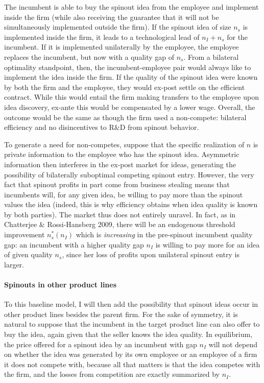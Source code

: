\documentclass[12pt,english]{article}
\theoremstyle{remark}
\begin{document}
The incumbent is able to buy the spinout idea from the employee and implement inside the firm (while also receiving the guarantee that it will not be simultaneously implemented outside the firm). If the spinout idea of size $n_s$ is implemented inside the firm, it leads to a technological lead of $n_I + n_s$ for the incumbent. If it is implemented unilaterally by the employee, the employee replaces the incumbent, but now with a quality gap of $n_s$. From a bilateral optimality standpoint, then, the incumbent-employee pair would always like to implement the idea inside the firm. If the quality of the spinout idea were known by both the firm and the employee, they would ex-post settle on the efficient contract. While this would entail the firm making transfers to the employee upon idea discovery, ex-ante this would be compensated by a lower wage. Overall, the outcome would be the same as though the firm used a non-compete: bilateral efficiency and no disincentives to R\&D from spinout behavior. 

To generate a need for non-competes, suppose that the specific realization of $n$ is private information to the employee who has the spinout idea. Asymmetric information then interferes in the ex-post market for ideas, generating the possibility of bilaterally suboptimal competing spinout entry. However, the very fact that spinout profits in part come from business stealing means that incumbents will, for any given idea, be willing to pay more than the spinout values the idea (indeed, this is why efficiency obtains when idea quality is known by both parties). The market thus does not entirely unravel. In fact, as in Chatterjee \& Rossi-Hansberg 2009, there will be an endogenous threshold improvement $n_s^*(n_I)$ which is \textit{increasing} in the pre-spinout incumbent quality gap: an incumbent with a higher quality gap $n_I$ is willing to pay more for an idea of given quality $n_s$, since her loss of profits upon unilateral spinout entry is larger.

\paragraph{Spinouts in other product lines}

To this baseline model, I will then add the possibility that spinout ideas occur in other product lines besides the parent firm. For the sake of symmetry, it is natural to suppose that the incumbent in the target product line can also offer to buy the idea, again given that the seller knows the idea quality. In equilibrium, the price offered for a spinout idea by an incumbent with gap $n_I$ will not depend on whether the idea was generated by its own employee or an employee of a firm it does not compete with, because all that matters is that the idea competes with the firm, and the losses from competition are exactly summarized by $n_I$. 
\end{document}
